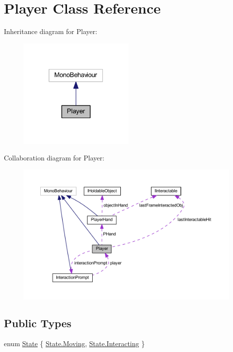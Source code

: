 \hypertarget{class_player}{}\section{Player Class Reference}
\label{class_player}


Inheritance diagram for Player\+:
\nopagebreak
\begin{figure}[H]
\begin{center}
\leavevmode
\includegraphics[width=163pt]{class_player__inherit__graph}
\end{center}
\end{figure}


Collaboration diagram for Player\+:
\nopagebreak
\begin{figure}[H]
\begin{center}
\leavevmode
\includegraphics[width=350pt]{class_player__coll__graph}
\end{center}
\end{figure}
\subsection*{Public Types}
\begin{DoxyCompactItemize}
\item 
enum \mbox{\hyperlink{class_player_aa3b6104791d642173caf761cf81f8c08}{State}} \{ \mbox{\hyperlink{class_player_aa3b6104791d642173caf761cf81f8c08adefe967ad0373b2274fc298f19125ca7}{State.\+Moving}}, 
\mbox{\hyperlink{class_player_aa3b6104791d642173caf761cf81f8c08af023446a52e84d38f186937dad1d8f76}{State.\+Interacting}}
 \}
\end{DoxyCompactItemize}
